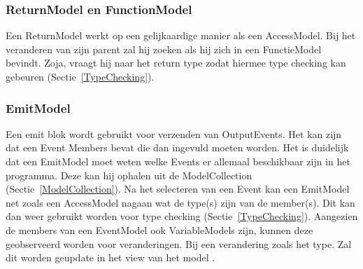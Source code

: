 \documentclass[]{article}
\begin{document}
\subsubsection{ReturnModel en FunctionModel}
\label{returnModel}
Een ReturnModel werkt op een gelijkaardige manier als een AccessModel. Bij het veranderen van zijn parent zal hij zoeken als hij zich in een FunctieModel bevindt. Zoja, vraagt hij naar het return type zodat hiermee type checking kan gebeuren (Sectie~\ref{TypeChecking}).

\subsubsection{EmitModel}
\label{EmitModel}
Een emit blok wordt gebruikt voor verzenden van OutputEvents. Het kan zijn dat een Event Members bevat die dan ingevuld moeten worden. Het is duidelijk dat een EmitModel moet weten welke Events er allemaal beschikbaar zijn in het programma. Deze kan hij ophalen uit de ModelCollection (Sectie~\ref{ModelCollection}). Na het selecteren van een Event kan een EmitModel net zoals een AccessModel nagaan wat de type(s) zijn van de member(s). Dit kan dan weer gebruikt worden voor type checking (Sectie~\ref{TypeChecking}). Aangezien de members van een EventModel ook VariableModels zijn, kunnen deze geobserveerd worden voor veranderingen. Bij een verandering zoals het type. Zal dit worden geupdate in het view van het model . 
  
\end{document}
